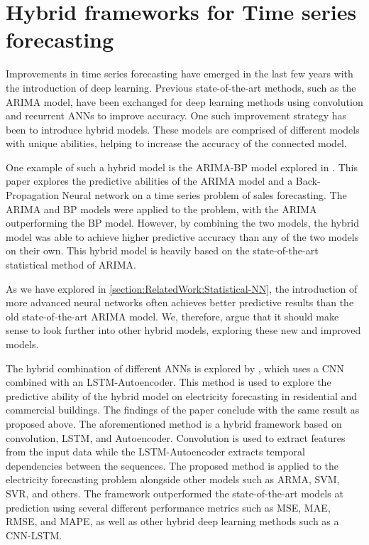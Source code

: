 \section{Hybrid frameworks for Time series forecasting}
\label{section:RelatedWork:Hybrid}

Improvements in time series forecasting have emerged in the last few years with the introduction of deep learning.
Previous state-of-the-art methods, such as the ARIMA model, have been exchanged for deep learning methods using convolution and recurrent ANNs to improve accuracy.
One such improvement strategy has been to introduce hybrid models.
These models are comprised of different models with unique abilities, helping to increase the accuracy of the connected model.


One example of such a hybrid model is the ARIMA-BP model explored in \cite{Bowen2020}.
This paper explores the predictive abilities of the ARIMA model and a Back-Propagation Neural network on a time series problem of sales forecasting.
The ARIMA and BP models were applied to the problem, with the ARIMA outperforming the BP model.
However, by combining the two models, the hybrid model was able to achieve higher predictive accuracy than any of the two models on their own.
This hybrid model is heavily based on the state-of-the-art statistical method of ARIMA.

As we have explored in \autoref{section:RelatedWork:Statistical-NN}, the introduction of more advanced neural networks often achieves better predictive results than the old state-of-the-art ARIMA model.
We, therefore, argue that it should make sense to look further into other hybrid models, exploring these new and improved models.


The hybrid combination of different ANNs is explored by \cite{Khan2020}, which uses a CNN combined with an LSTM-Autoencoder.
This method is used to explore the predictive ability of the hybrid model on electricity forecasting in residential and commercial buildings.
The findings of the paper conclude with the same result as proposed above.
The aforementioned method is a hybrid framework based on convolution, LSTM, and Autoencoder.
Convolution is used to extract features from the input data while the LSTM-Autoencoder extracts temporal dependencies between the sequences.
The proposed method is applied to the electricity forecasting problem alongside other models such as ARMA, SVM, SVR, and others.
The framework outperformed the state-of-the-art models at prediction using several different performance metrics such as MSE, MAE, RMSE, and MAPE,
as well as other hybrid deep learning methods such as a CNN-LSTM.


